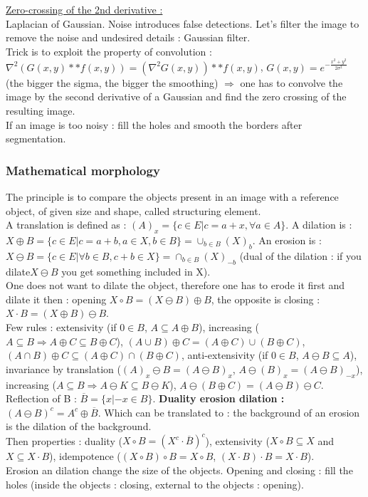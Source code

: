 \documentclass[../main.tex]{subfiles}
\begin{document}
\quad \underline{Zero-crossing of the 2nd derivative :}\\
Laplacian of Gaussian. Noise introduces false detections. Let's filter the image to remove the noise and undesired details : Gaussian filter.\\
Trick is to exploit the property of convolution : $\nabla^2 (G(x,y)**f(x,y))= (\nabla^2 G(x,y))**f(x,y)$, $G(x,y) = e^{-\frac{x^2+y^2}{2\sigma^2}}$ (the bigger the sigma, the bigger the smoothing) $\Rightarrow$ one has to convolve the image by the second derivative of a Gaussian and find the zero crossing of the resulting image.\\ 

\warning If an image is too noisy : fill the holes and smooth the borders after segmentation.\\

\subsubsection{Mathematical morphology}
The principle is to compare the objects present in an image with a reference object, of given size and shape, called structuring element. \\
A translation is defined as : $(A)_x = \{c\in E \lvert c=a+x, \forall a\in A\}$. A dilation is : $X\oplus B = \{c\in E \lvert c=a+b, a\in X, b\in B\} = \cup_{b\in B} (X)_b$. An erosion is : $X\ominus B = \{c\in E \lvert \forall b\in B, c+b\in X\} = \cap_{b\in B} (X)_{-b}$ (dual of the dilation : if you dilate$X\ominus B$ you get something included in X).\\
One does not want to dilate the object, therefore one has to erode it first and dilate it then : opening $X\circ B = (X\ominus B)\oplus B$, the opposite is closing : $X\cdot B = (X\oplus B) \ominus B$.\\

Few rules : extensivity (if $0\in B$, $A\subseteq A\oplus B$), increasing ($A\subseteq B \Rightarrow A\oplus C \subseteq B\oplus C$), $(A\cup B)\oplus C = (A\oplus C) \cup (B\oplus C)$, $(A\cap B) \oplus C \subseteq (A\oplus C)\cap (B\oplus C)$, anti-extensivity (if $0\in B$, $A\ominus B\subseteq A$), invariance by translation ($(A)_x \ominus B = (A\ominus B)_x$, $A\ominus (B)_x = (A\ominus B)_{-x}$), increasing ($A\subseteq B \Rightarrow A\ominus K \subseteq B\ominus K$), $A\ominus (B\oplus C) = (A\ominus B)\ominus C$.\\

Reflection of B : $\overline{B} = \{x \lvert -x\in B\}$. \textbf{Duality erosion dilation :} $(A\ominus B)^c = A^c \oplus \overline{B}$. Which can be translated to : the background of an erosion is the dilation of the background. \\

Then properties : duality ($X\circ B = (X^c \cdot \overline{B})^c$), extensivity ($X\circ B\subseteq X$ and $X\subseteq X\cdot B$), idempotence ($(X\circ B)\circ B = X\circ B$, $(X\cdot B)\cdot B = X\cdot B$).\\
Erosion an dilation change the size of the objects. Opening and closing : fill the holes (inside the objects : closing, external to the objects : opening).
\end{document}
